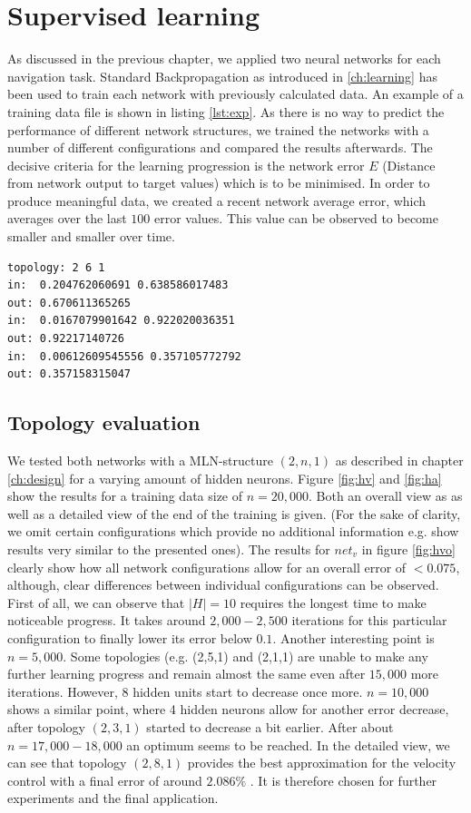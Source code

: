 \documentclass[10pt,a4paper,DIV=11]{scrreprt}
\begin{document}
\section{Supervised learning}

As discussed in the previous chapter, we applied two neural networks for each navigation task. Standard Backpropagation as introduced in \ref{ch:learning} has been used
to train each network with previously calculated data. An example of a training data file is shown in listing \ref{lst:exp}. As there is no way to predict the performance 
of different network structures, we trained the networks with a number of different configurations and compared the results afterwards. The decisive criteria for the
learning progression is the network error $E$ (Distance from network output to target values) which is to be minimised. In order to produce meaningful data, we created
a recent network average error, which averages over the last $100$ error values. This value can be observed to become smaller and smaller over time. 

\begin{lstlisting}[caption={An example of data used to train $net_v$ with Backpropagation.},label={lst:exp},stepnumber=1]
topology: 2 6 1
in:  0.204762060691 0.638586017483
out: 0.670611365265
in:  0.0167079901642 0.922020036351
out: 0.92217140726
in:  0.00612609545556 0.357105772792
out: 0.357158315047
\end{lstlisting}

\subsection{Topology evaluation} 
We tested both networks with a MLN-structure $(2,n,1)$ as described in chapter \ref{ch:design} for a varying amount of hidden neurons.
Figure \ref{fig:hv} and \ref{fig:ha} show the results for a training data size of $n = 20,000$. Both an overall view as as well as a detailed view of the end of the training is given.
(For the sake of clarity, we omit certain configurations which provide no additional information e.g. show results very similar to the presented ones).
The results for $net_v$ in figure \ref{fig:hvo} clearly show how all network configurations allow for an overall error of $<0.075$, although, clear differences between individual 
configurations can be observed. First of all, we can observe that $|H| = 10$ requires the longest time to make noticeable progress. It takes around $2,000-2,500$ iterations for this 
particular configuration to finally lower its error below $0.1$. Another interesting point is $n=5,000$. Some topologies (e.g. (2,5,1) and (2,1,1) are unable to make any 
further learning progress and remain almost the same even after $15,000$ more iterations. However, 8 hidden units start to decrease once more. $n=10,000$ shows a similar point, where
4 hidden neurons allow for another error decrease, after topology $(2,3,1)$ started to decrease a bit earlier. After about $n=17,000-18,000$ an optimum seems to be reached. 
In the detailed view, we can see that topology $(2,8,1)$ provides the best approximation for the velocity control with a final error of around $2.086\%$ . 
It is therefore chosen for further experiments and the final application.
\end{document}
